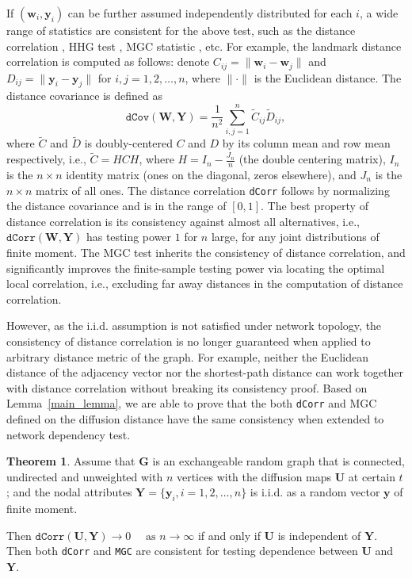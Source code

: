 \documentclass[11pt]{article}
\theoremstyle{definition}
\newtheorem{theorem}{Theorem}[section]
\begin{document}
If $(\mathbf{w}_{i}, \mathbf{y}_{i} )$ can be further assumed independently distributed for each $i$, a wide range of statistics are consistent for the above test, such as the distance correlation \cite{szekely2007measuring}, HHG test \cite{HellerGorfine2013}, MGC statistic \cite{shen2016discovering}, etc. For example, the landmark distance correlation is computed as follows: denote $C_{ij} = \parallel \mathbf{w}_{i} - \mathbf{w}_{j} \parallel$ and $D_{ij} = \parallel \mathbf{y}_{i} - \mathbf{y}_{j} \parallel$ for $i,j=1,2, \ldots ,n$, where $\parallel \cdot \parallel$ is the Euclidean distance. The distance covariance is defined as 
\begin{equation}	 
\label{eq:dCov}
\texttt{dCov}(\mathbf{W}, \mathbf{Y}) = \frac{1}{n^2} \sum\limits_{i,j=1}^{n} \tilde{C}_{ij} \tilde{D}_{ij},
\end{equation}
where $\tilde{C}$ and $\tilde{D}$ is doubly-centered $C$ and $D$ by its column mean and row mean respectively, i.e., $\tilde{C}=HCH$, where $H=I_{n}-\frac{J_{n}}{n}$ (the double centering matrix), $I_n$ is the $n \times n$ identity matrix (ones on the diagonal, zeros elsewhere), and $J_n$ is the $n \times n$ matrix of all ones. The distance correlation \texttt{dCorr} follows by normalizing the distance covariance and is in the range of $[0,1]$. The best property of distance correlation is its consistency against almost all alternatives, i.e., $\texttt{dCorr}(\mathbf{W}, \mathbf{Y})$ has testing power $1$ for $n$ large, for any joint distributions of finite moment. The MGC test inherits the consistency of distance correlation, and significantly improves the finite-sample testing power via locating the optimal local correlation, i.e., excluding far away distances in the computation of distance correlation.

However, as the i.i.d. assumption is not satisfied under network topology, the consistency of distance correlation is no longer guaranteed when applied to arbitrary distance metric of the graph. For example, neither the Euclidean distance of the adjacency vector nor the shortest-path distance can work together with distance correlation without breaking its consistency proof. Based on Lemma~\ref{main_lemma}, we are able to prove that the both \texttt{dCorr} and MGC defined on the diffusion distance have the same consistency when extended to network dependency test.

\begin{theorem}
Assume that $\mathbf{G}$ is an exchangeable random graph that is connected, undirected and unweighted with $n$ vertices with the diffusion maps $\mathbf{U}$ at certain $t$; and the nodal attributes $\mathbf{Y}=\{ \mathbf{y}_{i}, i = 1,2, \ldots, n \}$ is i.i.d. as a random vector $\mathbf{y}$ of finite moment. 

Then $\texttt{dCorr}(\mathbf{U}, \mathbf{Y}) \longrightarrow 0 \quad \mbox{ as } n \rightarrow \infty$ if and only if $\mathbf{U}$ is independent of $\mathbf{Y}$. Then both \texttt{dCorr} and \texttt{MGC} are consistent for testing dependence between $\mathbf{U}$ and $\mathbf{Y}$.
	\label{theoremMain}
\end{theorem}
\end{document}
